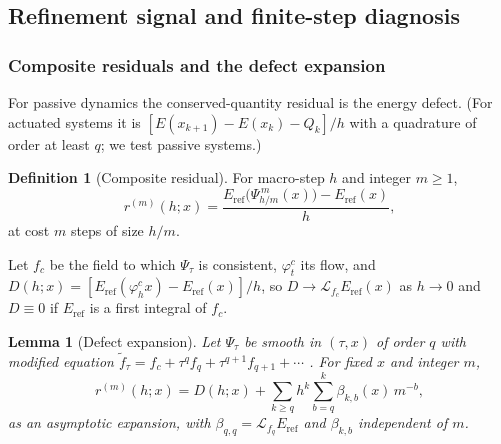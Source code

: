 \documentclass[10pt]{article}
\newtheorem{lemma}{Lemma}
\theoremstyle{definition}
\newtheorem{definition}{Definition}
\newcommand{\Lie}{\mathcal{L}}
\newcommand{\Eref}{E_{\mathrm{ref}}}
\begin{document}
\subsection{Refinement signal and finite-step diagnosis}\label{sec:refinement}

\subsubsection{Composite residuals and the defect expansion}

For passive dynamics the conserved-quantity residual is the energy defect.
(For actuated systems it is $[E(x_{k+1})-E(x_k)-Q_k]/h$ with a quadrature
of order at least $q$; we test passive systems.)

\begin{definition}[Composite residual]
For macro-step $h$ and integer $m\ge1$,
\begin{equation}\label{eq:rm}
  r^{(m)}(h;x)=\frac{\Eref\big(\Psi_{h/m}^{\,m}(x)\big)-\Eref(x)}{h},
\end{equation}
at cost $m$ steps of size $h/m$.
\end{definition}

Let $f_c$ be the field to which $\Psi_\tau$ is consistent, $\varphi^c_t$ its
flow, and $D(h;x)=[\Eref(\varphi^c_h x)-\Eref(x)]/h$, so
$D\to\Lie_{f_c}\Eref(x)$ as $h\to0$ and $D\equiv0$ if $\Eref$ is a first
integral of $f_c$.

\begin{lemma}[Defect expansion]\label{lem:defect}
Let $\Psi_\tau$ be smooth in $(\tau,x)$ of order $q$ with modified equation
$\tilde f_\tau=f_c+\tau^qf_q+\tau^{q+1}f_{q+1}+\cdots$
\citep[Ch.~IX]{hairer2006geometric}. For fixed $x$ and integer $m$,
\begin{equation}\label{eq:defect}
  r^{(m)}(h;x)=D(h;x)+\sum_{k\ge q}h^k\sum_{b=q}^{k}\beta_{k,b}(x)\,m^{-b},
\end{equation}
as an asymptotic expansion, with $\beta_{q,q}=\Lie_{f_q}\Eref$ and
$\beta_{k,b}$ independent of $m$.
\end{lemma}
\end{document}
